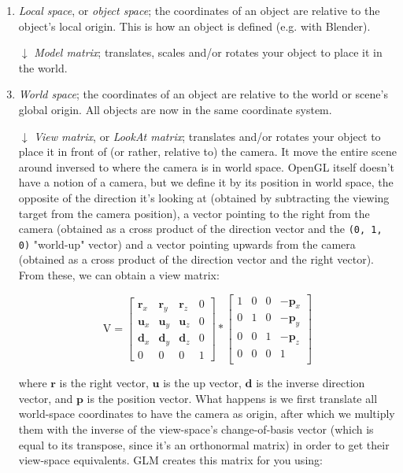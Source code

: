\documentclass[8pt, table, xcdraw]{article}%
\begin{document}
\begin{enumerate}
    \item \emph{Local space}, or \emph{object space}; the coordinates of an object are relative to the object's local origin. This is how an object is defined (e.g. with Blender).
    \item[\large$\downarrow$] \emph{Model matrix}; translates, scales and/or rotates your object to place it in the world.
    \item \emph{World space}; the coordinates of an object are relative to the world or scene's global origin. All objects are now in the same coordinate system.
    \item[\large$\downarrow$] \emph{View matrix}, or \emph{LookAt matrix}; translates and/or rotates your object to place it in front of (or rather, relative to) the camera. It move the entire scene around inversed to where the camera is in world space. OpenGL itself doesn't have a notion of a camera, but we define it by its position in world space, the opposite of the direction it's looking at (obtained by subtracting the viewing target from the camera position), a vector pointing to the right from the camera (obtained as a cross product of the direction vector and the \lstinline{(0, 1, 0)} "world-up" vector) and a vector pointing upwards from the camera (obtained as a cross product of the direction vector and the right vector). From these, we can obtain a view matrix:
    
    \begin{equation}
    \text{V} = \begin{bmatrix}
        \bm{r}_x & \bm{r}_y & \bm{r}_z & 0\\
        \bm{u}_x & \bm{u}_y & \bm{u}_z & 0\\
        \bm{d}_x & \bm{d}_y & \bm{d}_z & 0\\
        0        & 0        & 0        & 1
        \end{bmatrix} *
        \begin{bmatrix}
        1 & 0 & 0 & -\bm{p}_x\\
        0 & 1 & 0 & -\bm{p}_y\\
        0 & 0 & 1 & -\bm{p}_z\\
        0 & 0 & 0 & 1\\
        \end{bmatrix}
    \end{equation}
    
    where $\bm{r}$ is the right vector, $\bm{u}$ is the up vector, $\bm{d}$ is the inverse direction vector, and $\bm{p}$ is the position vector. What happens is we first translate all world-space coordinates to have the camera as origin, after which we multiply them with the inverse of the view-space's change-of-basis vector (which is equal to its transpose, since it's an orthonormal matrix) in order to get their view-space equivalents. GLM creates this matrix for you using:
    

\end{enumerate}
\end{document}
